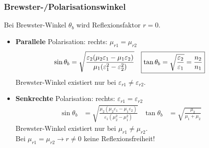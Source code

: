 \subsubsection[Brewster-/Polarisationswinkel]{Brewster-/Polarisationswinkel}
Bei Brewster-Winkel $ \theta_b $ wird Reflexionsfaktor $r=0$.
\begin{itemize}
	\item \textbf{Parallele} Polarisation: \quad rechts:
	$ \mu_{r1}=\mu_{r2} $
	\begin{align*}
		\sin\theta_b & = \sqrt{\frac{\varepsilon_2(\mu_2\varepsilon_1 - \mu_1\varepsilon_2)}{\mu_1(\varepsilon_1^2-\varepsilon_2^2)}} &
		\Aboxed{\tan\theta_b & = \sqrt{\frac{\varepsilon_2}{\varepsilon_1}} = \frac{n_2}{n_1}}&
	\end{align*}
		Brewster-Winkel existiert nur bei $ \varepsilon_{r1} \neq \varepsilon_{r2} $.
    \item \textbf{Senkrechte} Polarisation:  \quad rechts: $ \varepsilon_{r1} = \varepsilon_{r2} $
	\begin{align*}
		\sin\theta_b & = \sqrt{\frac{\mu_2(\mu_2\varepsilon_1 - \mu_1\varepsilon_2)}{\varepsilon_1(\mu_2^2-\mu_1^2)}}&
		\tan\theta_b & = \sqrt{\frac{\mu_2}{\mu_1+\mu_2}}&
	\end{align*}
	Brewster-Winkel existiert nur bei $ \mu_{r1} \neq \mu_{r2} $.\\
	Bei $ \mu_{r1}=\mu_{r2} \rightarrow r \neq 0$ keine Reflexionsfreiheit!
\end{itemize}
\newpage
